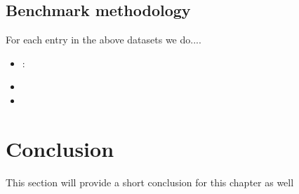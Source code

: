 \subsection{Benchmark methodology }
For each entry in the above datasets we do.... 


\begin{itemize}
	\item:
	
	\item
	
	\item
\end{itemize}



\section{Conclusion}\label{sec:custom}
This section will provide a short conclusion for this chapter as well
